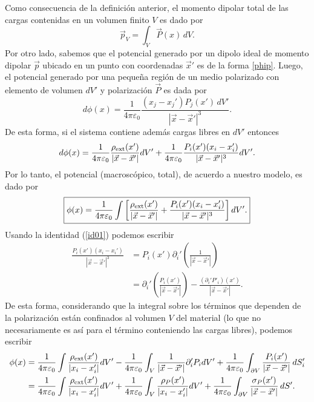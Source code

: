 Como consecuencia de la definición anterior, el momento dipolar
total de las cargas contenidas en un volumen finito $V$ es dado por
\begin{equation}\label{pintPdV}
 \vec{p}_V=\int_V \vec{P}(x)\,dV.
\end{equation}
Por otro lado, sabemos que el potencial generado por un dipolo ideal de momento dipolar $\vec{p}$ ubicado en un punto con coordenadas $\vec{x}'$ es de la forma \eqref{phip}. Luego, el potencial generado por una peque\~na región de un medio polarizado con elemento de volumen $dV'$ y polarización $\vec{P}$ es dada por
\begin{equation}
d\phi(x)=\frac{1}{4\pi\varepsilon_0}\frac{(x_j-x_j')P_j(x')\,dV'}{|\vec{x}-\vec{
x}'|^3}.
\end{equation}
De esta forma, si el sistema contiene además cargas libres en $dV'$ entonces
\begin{equation}
d\phi(x)=\frac{1}{4\pi\varepsilon_0}\frac{\rho_{\rm
ext}(x')}{|\vec{x}-\vec{x}'|}dV'+\frac {1}{
4\pi\varepsilon_0}\frac{P_i(x')(x_i-x_i')}{|\vec{x}-\vec{x}'|^3}dV'.
\end{equation}
Por lo tanto, el potencial (macroscópico, total), de acuerdo a nuestro modelo, es dado por
\begin{equation}
\boxed{\phi(x)=\frac{1}{4\pi\varepsilon_0}\int\left[\frac{\rho_{\rm
ext}(x')}{|\vec{x}-\vec{x}'|}+\frac{P_i(x')(x_i-x_i')}{|\vec{x}-\vec{x}'|^3}\right]dV'.}
\end{equation}
Usando la identidad (\ref{id01}) podemos escribir
\begin{align}
\frac{P_i(x')(x_i-x_i')}{|\vec{x}-\vec{x}'|^3}  &
=P_i(x')\partial_i'\left(  \frac{1}{|\vec{x}-\vec{x}'|}\right)\\
&=\partial_i'\left(\frac{P_i(x')}{|\vec{x}-\vec{x}'|}\right)-\frac{
(\partial_i'P'_i)(x')} {|\vec{x}-\vec{ x}'|}.
\end{align}
De esta forma, considerando que la integral sobre los términos que dependen de la polarización están confinados al volumen $V$ del material (lo que no necesariamente es así para el término conteniendo las cargas libres), podemos escribir
\begin{align}
\phi(x)& =\frac{1}{4\pi\varepsilon_0}\int\frac{\rho_{\rm ext}(x')}{|x_i-x_i'|}dV'-\frac{1}{4\pi\varepsilon_0}\int_V\frac{1}
{|\vec{x}-\vec{x}'|}\partial_i'P_idV'+\frac{1}{4\pi\varepsilon_0}\int_{
\partial V}\frac{P_i(x')}{|\vec{x}-\vec{x}'|}\,dS'_i \\
& =\frac{1}{4\pi\varepsilon_0}\int\frac{\rho_{\rm ext}(x')}{|x_i-x_i'|}dV'+\frac{1}{4\pi\varepsilon_0}\int_V\frac{\rho_P(x')}{|x_i-x_i'|}dV'+\frac{1}{4\pi\varepsilon_0}\int_{
\partial V}\frac{\sigma_P(x')}{|\vec{x}-\vec{x}'|}\,dS' .
\end{align}
